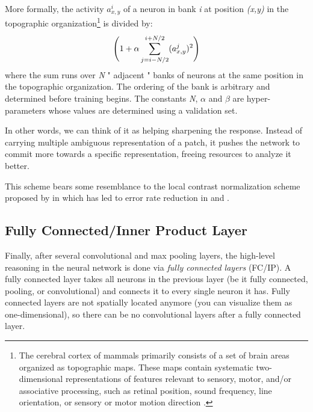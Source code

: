 More formally, the activity $a_{x,y}^{i}$ of a neuron in bank \textit{i} at position \textit{(x,y)} in the topographic organization\footnote{The cerebral cortex of mammals primarily consists of a set of brain areas organized as topographic maps. These maps contain systematic two-dimensional representations of features relevant to sensory, motor, and/or associative processing, such as retinal position, sound frequency, line orientation, or sensory or motor motion direction \cite{patel2014topographic}.} is divided by:
\begin{equation}
\centering
\Bigg( 1+ \alpha \sum_{j=i-N/2}^{i+N/2} (a_{x,y}^{j})^{2} \Bigg)
\end{equation}
where the sum runs over \textit{N} " adjacent " banks of neurons at the same position in the topographic organization. The ordering of the bank is arbitrary and determined before training begins. The constants \textit{N}, $\alpha$ and $\beta$ are hyper-parameters whose values are determined using a validation set.

In other words, we can think of it as helping sharpening the response. Instead of carrying multiple ambiguous representation of a patch, it pushes the network to commit more towards a specific representation, freeing resources to analyze it better.

\indent This scheme bears some resemblance to the local contrast normalization scheme proposed by \citeauthor{jarrett2009best} in \cite{jarrett2009best} which has led to error rate reduction in \cite{krizhevsky2012imagenet} and \cite{hinton2012improving}. 

\subsection{Fully Connected/Inner Product Layer}

Finally, after several convolutional and max pooling layers, the high-level reasoning in the neural network is done via \textit{fully connected layers} (FC/IP). A fully connected layer takes all neurons in the previous layer (be it fully connected, pooling, or convolutional) and connects it to every single neuron it has. Fully connected layers are not spatially located anymore (you can visualize them as one-dimensional), so there can be no convolutional layers after a fully connected layer. 




